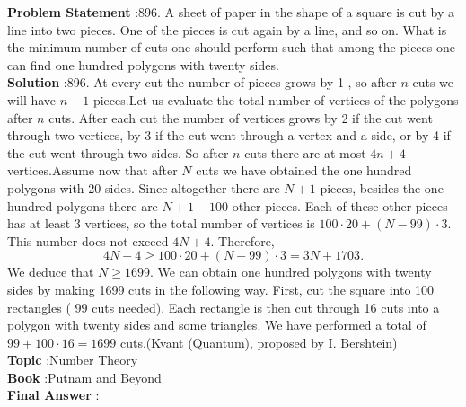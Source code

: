 \documentclass[10pt]{article}
\begin{document}
\textbf{Problem Statement} :896. A sheet of paper in the shape of a square is cut by a line into two pieces. One of the pieces is cut again by a line, and so on. What is the minimum number of cuts one should perform such that among the pieces one can find one hundred polygons with twenty sides.\\
\textbf{Solution} :896. At every cut the number of pieces grows by 1 , so after $n$ cuts we will have $n+1$ pieces.Let us evaluate the total number of vertices of the polygons after $n$ cuts. After each cut the number of vertices grows by 2 if the cut went through two vertices, by 3 if the cut went through a vertex and a side, or by 4 if the cut went through two sides. So after $n$ cuts there are at most $4 n+4$ vertices.Assume now that after $N$ cuts we have obtained the one hundred polygons with 20 sides. Since altogether there are $N+1$ pieces, besides the one hundred polygons there are $N+1-100$ other pieces. Each of these other pieces has at least 3 vertices, so the total number of vertices is $100 \cdot 20+(N-99) \cdot 3$. This number does not exceed $4 N+4$. Therefore,$$ 4 N+4 \geq 100 \cdot 20+(N-99) \cdot 3=3 N+1703 . $$We deduce that $N \geq 1699$. We can obtain one hundred polygons with twenty sides by making 1699 cuts in the following way. First, cut the square into 100 rectangles ( 99 cuts needed). Each rectangle is then cut through 16 cuts into a polygon with twenty sides and some triangles. We have performed a total of $99+100 \cdot 16=1699$ cuts.(Kvant (Quantum), proposed by I. Bershtein)\\
\textbf{Topic} :Number Theory\\
\textbf{Book} :Putnam and Beyond\\
\textbf{Final Answer} :\\
\end{document}
